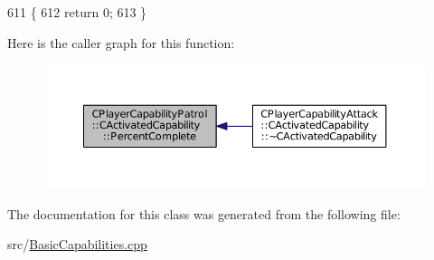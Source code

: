 \begin{DoxyCode}
611                                                                        \{
612     \textcolor{keywordflow}{return} 0;
613 \}
\end{DoxyCode}
Here is the caller graph for this function\+:
\nopagebreak
\begin{figure}[H]
\begin{center}
\leavevmode
\includegraphics[width=350pt]{classCPlayerCapabilityPatrol_1_1CActivatedCapability_a868e6583a55b01e5aa3b926ef14677bc_icgraph}
\end{center}
\end{figure}


The documentation for this class was generated from the following file\+:\begin{DoxyCompactItemize}
\item 
src/\hyperlink{BasicCapabilities_8cpp}{Basic\+Capabilities.\+cpp}\end{DoxyCompactItemize}
